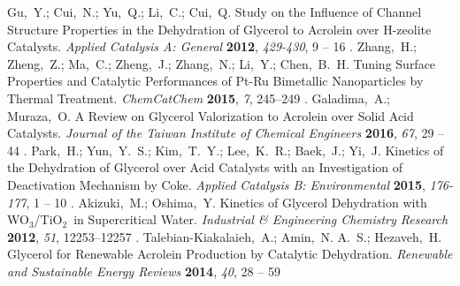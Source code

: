 \documentclass[journal=iecred,manuscript=article]{achemso}
\begin{document}
{\begin{mcitethebibliography}
Gu,~Y.; Cui,~N.; Yu,~Q.; Li,~C.; Cui,~Q. Study on the Influence of Channel
  Structure Properties in the Dehydration of Glycerol to Acrolein over
  H-zeolite Catalysts. \emph{Applied Catalysis A: General} \textbf{2012},
  \emph{429-430}, 9 -- 16\relax
\mciteBstWouldAddEndPuncttrue
\mciteSetBstMidEndSepPunct{\mcitedefaultmidpunct}
{\mcitedefaultendpunct}{\mcitedefaultseppunct}\relax
\unskip.
Zhang,~H.; Zheng,~Z.; Ma,~C.; Zheng,~J.; Zhang,~N.; Li,~Y.; Chen,~B.~H. Tuning
  Surface Properties and Catalytic Performances of Pt-Ru Bimetallic
  Nanoparticles by Thermal Treatment. \emph{ChemCatChem} \textbf{2015},
  \emph{7}, 245--249\relax
\mciteBstWouldAddEndPuncttrue
\mciteSetBstMidEndSepPunct{\mcitedefaultmidpunct}
{\mcitedefaultendpunct}{\mcitedefaultseppunct}\relax
\unskip.
Galadima,~A.; Muraza,~O. A Review on Glycerol Valorization to Acrolein over
  Solid Acid Catalysts. \emph{Journal of the Taiwan Institute of Chemical
  Engineers} \textbf{2016}, \emph{67}, 29 -- 44\relax
\mciteBstWouldAddEndPuncttrue
\mciteSetBstMidEndSepPunct{\mcitedefaultmidpunct}
{\mcitedefaultendpunct}{\mcitedefaultseppunct}\relax
\unskip.
Park,~H.; Yun,~Y.~S.; Kim,~T.~Y.; Lee,~K.~R.; Baek,~J.; Yi,~J. Kinetics of the
  Dehydration of Glycerol over Acid Catalysts with an Investigation of
  Deactivation Mechanism by Coke. \emph{Applied Catalysis B: Environmental}
  \textbf{2015}, \emph{176-177}, 1 -- 10\relax
\mciteBstWouldAddEndPuncttrue
\mciteSetBstMidEndSepPunct{\mcitedefaultmidpunct}
{\mcitedefaultendpunct}{\mcitedefaultseppunct}\relax
\unskip.
Akizuki,~M.; Oshima,~Y. Kinetics of Glycerol Dehydration with WO$_3$/TiO$_2$\  in
  Supercritical Water. \emph{Industrial \& Engineering Chemistry Research}
  \textbf{2012}, \emph{51}, 12253--12257\relax
\mciteBstWouldAddEndPuncttrue
\mciteSetBstMidEndSepPunct{\mcitedefaultmidpunct}
{\mcitedefaultendpunct}{\mcitedefaultseppunct}\relax
\unskip.
Talebian-Kiakalaieh,~A.; Amin,~N. A.~S.; Hezaveh,~H. Glycerol for Renewable
  Acrolein Production by Catalytic Dehydration. \emph{Renewable and Sustainable
  Energy Reviews} \textbf{2014}, \emph{40}, 28 -- 59\relax

\end{mcitethebibliography}}
\end{document}
